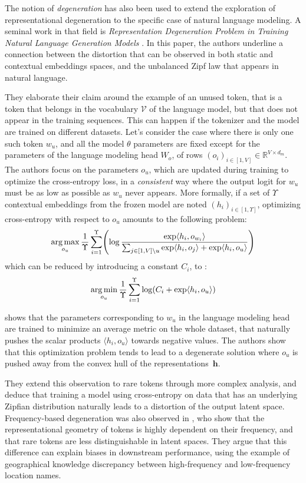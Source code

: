 The notion of \textit{degeneration} has also been used to extend the exploration of representational degeneration to the specific case of natural language modeling. A seminal work in that field is \textit{Representation Degeneration Problem in Training Natural Language Generation Models} \citep{gao2018representation}. In this paper, the authors underline a connection between the distortion that can be observed in both static and contextual embeddings spaces, and the unbalanced Zipf law that appears in natural language.

They elaborate their claim around the example of an unused token, that is a token that belongs in the vocabulary $\mathcal{V}$ of the language model, but that does not appear in the training sequences. This can happen if the tokenizer and the model are trained on different datasets. Let's consider the case where there is only one such token $w_u$, and all the model $\theta$ parameters are fixed except for the parameters of the language modeling head $W_o$, of rows $(o_i)_{i\in[1, V]} \in \mathbb{R}^{V \times d_m}$. The authors focus on the parameters $o_u$, which are updated during training to optimize the cross-entropy loss, in a \textit{consistent} way where the output logit for $w_u$ must be as low as possible as $w_u$ never appears. More formally, if a set of $\Upsilon$ contextual embeddings from the frozen model are noted $(h_i)_{i \in [1, \Upsilon]}$, optimizing cross-entropy with respect to $o_u$ amounts to the following problem:
$$
\argmax_{o_u} \frac{1}{\Upsilon} \sum_{i=1}^{\Upsilon}\left(\log \frac{\exp \langle h_i, o_{w_i} \rangle}{\sum_{j\in[1, V] \setminus u} \exp \langle h_i, o_{j} \rangle  + \exp \langle h_i, o_u \rangle}\right)
$$
which can be reduced by introducing a constant $C_i$, to :
\begin{equation}
    \label{eq:min_unused}
    \argmin_{o_u} \frac{1}{\Upsilon} \sum_{i=1}^{\Upsilon}\log \left(C_i  + \exp \langle h_i, o_u \rangle\right)
\end{equation}

 shows that the parameters corresponding to $w_u$ in the language modeling head are trained to minimize an average metric on the whole dataset, that naturally pushes the scalar products $\langle h_i, o_u \rangle$ towards negative values. The authors show that this optimization problem tends to lead to a degenerate solution where $o_u$ is pushed away from the convex hull of the representations~$\mathbf{h}$.

They extend this observation to rare tokens through more complex analysis, and deduce that training a model using cross-entropy on data that has an underlying Zipfian distribution naturally leads to a distortion of the output latent space. Frequency-based degeneration was also observed in \citet{zhou2021frequencybaseddistortionscontextualizedword}, who show that the representational geometry of tokens is highly dependent on their frequency, and that rare tokens are less distinguishable in latent spaces. They argue that this difference can explain biases in downstream performance, using the example of geographical knowledge discrepancy between high-frequency and low-frequency location names.

